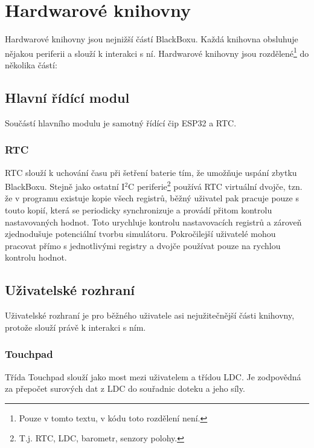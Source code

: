 \chapter{Hardwarové knihovny}
Hardwarové knihovny jsou nejnižší částí BlackBoxu.
Každá knihovna obsluhuje nějakou periferii a slouží k interakci s ní.
Hardwarové knihovny jsou rozdělené\footnote{Pouze v tomto textu, v kódu toto rozdělení není.} do několika částí:

\section{Hlavní řídící modul}

Součástí hlavního modulu je samotný řídící čip ESP32 a RTC.

\subsection{RTC}\label{ss:rtc}

RTC slouží k uchování času při šetření baterie tím, že umožňuje uspání zbytku BlackBoxu.
Stejně jako ostatní I$^2$C periferie\footnote{T.j. RTC, LDC, barometr, senzory polohy.} používá RTC virtuální dvojče, tzn. že v programu existuje kopie všech registrů, běžný uživatel pak pracuje pouze s touto kopií, která se periodicky synchronizuje a provádí přitom kontrolu nastavovaných hodnot.
Toto urychluje kontrolu nastavovacích registrů a zároveň zjednodušuje potenciální tvorbu simulátoru.
Pokročilejší uživatelé mohou pracovat přímo s jednotlivými registry a dvojče používat pouze na rychlou kontrolu hodnot.

\section{Uživatelské rozhraní}

Uživatelské rozhraní je pro běžného uživatele asi nejužitečnější části knihovny, protože slouží právě k interakci s ním.

\subsection{Touchpad}

Třída Touchpad slouží jako most mezi uživatelem a třídou LDC.
Je zodpovědná za přepočet surových dat z LDC do souřadnic doteku a jeho síly.

